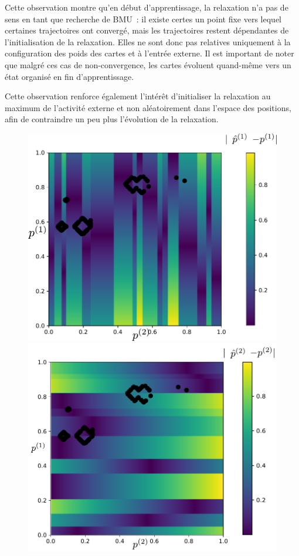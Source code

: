 \documentclass[../main]{subfiles}
\begin{document}
Cette observation montre qu'en début d'apprentissage, la relaxation n'a pas de sens en tant que recherche de BMU~: il existe certes un point fixe vers lequel certaines trajectoires ont convergé, mais les trajectoires restent dépendantes de l'initialisation de la relaxation. 
Elles ne sont donc pas relatives uniquement à la configuration des poids des cartes et à l'entrée externe.
Il est important de noter que malgré ces cas de non-convergence, les cartes évoluent quand-même vers un état organisé en fin d'apprentissage. 

Cette observation renforce également l'intérêt d'initialiser la relaxation au maximum de l'activité externe et non aléatoirement dans l'espace des positions, afin de contraindre un peu plus l'évolution de la relaxation.

\begin{figure}
	\begin{minipage}{0.5\textwidth}
	\centering
	\includegraphics[width=\textwidth]{champ_X_006_t1_notraj.pdf}
	\end{minipage}
	\begin{minipage}{0.5\textwidth}
	\centering
	\includegraphics[width=\textwidth]{champ_Y_006_t1_notraj.pdf}

\end{minipage}
\end{figure}
\end{document}
